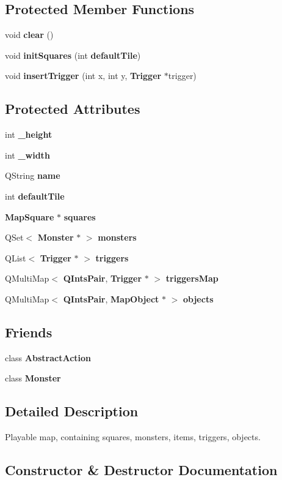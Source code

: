 \subsection*{Protected Member Functions}
\begin{CompactItemize}
\item 
void {\bf clear} ()
\item 
void {\bf init\-Squares} (int {\bf default\-Tile})
\item 
void {\bf insert\-Trigger} (int x, int y, {\bf Trigger} $\ast$trigger)
\end{CompactItemize}
\subsection*{Protected Attributes}
\begin{CompactItemize}
\item 
int {\bf \_\-height}
\item 
int {\bf \_\-width}
\item 
QString {\bf name}
\item 
int {\bf default\-Tile}
\item 
{\bf Map\-Square} $\ast$ {\bf squares}
\item 
QSet$<$ {\bf Monster} $\ast$ $>$ {\bf monsters}
\item 
QList$<$ {\bf Trigger} $\ast$ $>$ {\bf triggers}
\item 
QMulti\-Map$<$ {\bf QInts\-Pair}, {\bf Trigger} $\ast$ $>$ {\bf triggers\-Map}
\item 
QMulti\-Map$<$ {\bf QInts\-Pair}, {\bf Map\-Object} $\ast$ $>$ {\bf objects}
\end{CompactItemize}
\subsection*{Friends}
\begin{CompactItemize}
\item 
class {\bf Abstract\-Action}
\item 
class {\bf Monster}
\end{CompactItemize}


\subsection{Detailed Description}
Playable map, containing squares, monsters, items, triggers, objects. 



\subsection{Constructor \& Destructor Documentation}
